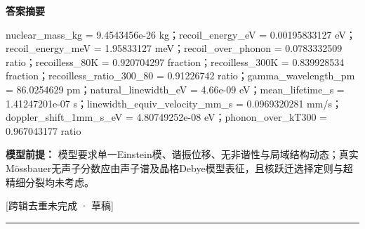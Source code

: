 \documentclass[UTF8,11pt,a4paper]{ctexart}
\begin{document}
\noindent\textbf{答案摘要}\par
nuclear\_mass\_kg = 9.4543456e-26 kg；recoil\_energy\_eV = 0.00195833127 eV；recoil\_energy\_meV = 1.95833127 meV；recoil\_over\_phonon = 0.0783332509 ratio；recoilless\_80K = 0.920704297 fraction；recoilless\_300K = 0.839928534 fraction；recoilless\_ratio\_300\_80 = 0.91226742 ratio；gamma\_wavelength\_pm = 86.0254629 pm；natural\_linewidth\_eV = 4.66e-09 eV；mean\_lifetime\_s = 1.41247201e-07 s；linewidth\_equiv\_velocity\_mm\_s = 0.0969320281 mm/s；doppler\_shift\_1mm\_s\_eV = 4.80749252e-08 eV；phonon\_over\_kT300 = 0.967043177 ratio\par
\noindent\textbf{模型前提：}
模型要求单一Einstein模、谐振位移、无非谐性与局域结构动态；真实Mössbauer无声子分数应由声子谱及晶格Debye模型表征，且核跃迁选择定则与超精细分裂均未考虑。\par
\noindent\textcolor{red!65!black}{[跨辑去重未完成 · 草稿]} \par
\medskip\hrule\medskip
{}
\end{document}
